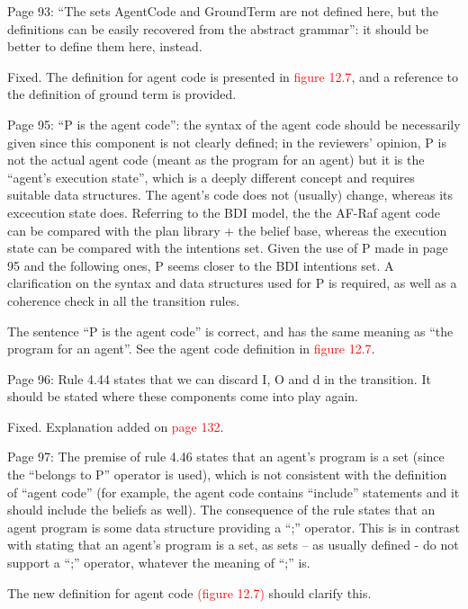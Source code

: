 \documentclass{article}
\newcommand*\R[1]{\textcolor{red}{#1}} %
\newenvironment{them}{\noindent\begingroup\color{blue}}{\endgroup\par}
\begin{document}
\begin{them}

Page 93:
``The sets AgentCode and GroundTerm are not defined here, but the definitions
can be easily recovered from the abstract grammar'': it should be better to
define them here, instead.

\end{them}
Fixed. The definition for agent code is presented in \R{figure 12.7}, and a
reference to the definition of ground term is provided.

\begin{them}

Page 95:
``P is the agent code'': the syntax of the agent code should be necessarily given
since this component is not clearly defined; in the reviewers' opinion, P is
not the actual agent code (meant as the program for an agent) but it is the
``agent's execution state'', which is a deeply different concept and requires
suitable data structures. The agent's code does not (usually) change, whereas
its excecution state does. Referring to the BDI model, the the AF-Raf agent
code can be compared with the plan library + the belief base, whereas the
execution state can be compared with the intentions set. Given the use of P
made in page 95 and the following ones, P seems closer to the BDI intentions
set. A clarification on the syntax and data structures used for P is required,
as well as a coherence check in all the transition rules.

\end{them}
The sentence ``P is the agent code'' is correct, and has the same meaning as ``the
program for an agent''. See the agent code definition in \R{figure 12.7}. 

\begin{them}

Page 96:
Rule 4.44 states that we can discard I, O and d in the transition. It should be
stated where these components come into play again.

\end{them}
Fixed. Explanation added on \R{page 132}.

\begin{them}

Page 97:
The premise of rule 4.46 states that an agent's program is a set (since the
``belongs to P'' operator is used), which is not consistent with the definition
of ``agent code'' (for example, the agent code contains ``include'' statements and
it should include the beliefs as well). The consequence of the rule states that
an agent program is some data structure providing a ``;'' operator. This is in
contrast with stating that an agent's program is a set, as sets – as usually
defined - do not support a ``;'' operator, whatever the meaning of ``;'' is.

\end{them}
The new definition for agent code \R{(figure 12.7)} should clarify this.
\end{document}
